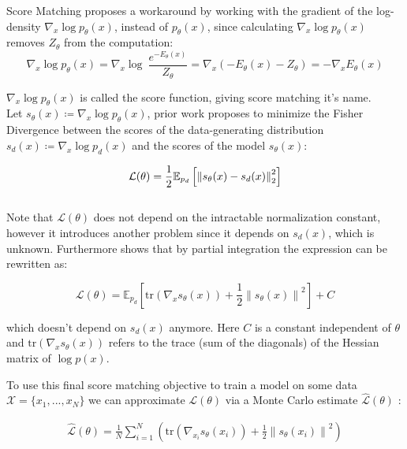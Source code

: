 Score Matching proposes a workaround by working with the gradient of the log-density $\nabla_x \log p_\theta(x)$, 
instead of $p_\theta(x)$, since calculating $\nabla_x \log p_\theta(x)$ removes $Z_\theta$ from the computation:
\[
    \nabla_x \log p_\theta(x) = \nabla_x \log \ \frac{e^{- E_\theta(x)}}{Z_\theta} = \nabla_x \left( - E_\theta(x) - {Z_\theta} \right) = - \nabla_x E_\theta(x)
\] 

$\nabla_x \log p_\theta(x)$ is called the score function, giving score matching it's name. \\
Let $s_\theta(x) \coloneqq \nabla_x \log p_\theta(x)$, prior work \cite{sm} proposes to minimize the Fisher Divergence between 
the scores of the data-generating distribution $s_d(x) \coloneqq \nabla_x \log p_d(x)$ and the scores of the model $s_\theta(x)$: 

\begin{equation}
    \label{eq:fisher}
    \mathcal{L}(\theta) = \frac{1}{2} \mathbb{E}_{p_d} \left[ \left\lVert s_\theta(x) - s_d(x)\right\rVert^2_2 \right]
\end{equation} \\

Note that $\mathcal{L}(\theta)$ does not depend on the intractable normalization constant, however it introduces another problem since it depends on 
$s_d(x)$, which is unknown. Furthermore \cite{sm} shows that by partial integration the expression can be rewritten as:

\begin{equation}
    \mathcal{L}(\theta) = \mathbb{E}_{p_d} \left[\text{tr} \left( \nabla_x s_\theta(x) \right) + \frac{1}{2} \left\| s_\theta(x) \right\|^2 \right] + C
\end{equation}

which doesn't depend on $s_d(x)$ anymore. Here $C$ is a constant independent of $\theta$ and $\text{tr} \left( \nabla_x s_\theta(x) \right)$ refers to the
trace (sum of the diagonals) of the Hessian matrix of $\log p(x)$.
 
To use this final score matching objective to train a model on some 
data $\mathcal{X} = \{x_1, ..., x_N\}$ we can approximate $\mathcal{L}(\theta)$ via a Monte Carlo estimate $\hat{\mathcal{L}}(\theta)$ \cite{sm}: 

\begin{align}
    \label{eq:sm_objective}
    \hat{\mathcal{L}}(\theta) = \frac{1}{N} \sum_{i=1}^{N} \left(\text{tr} \left( \nabla_{x_i} s_\theta(x_i) \right) + \frac{1}{2} \left\| s_\theta(x_i) \right\|^2 \right)
\end{align}

